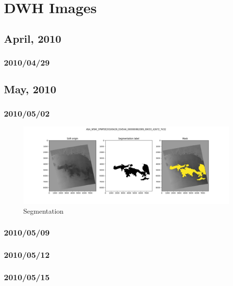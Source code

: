 \documentclass{article}
\begin{document}
\section{DWH Images}

\subsection{April, 2010}
\subsubsection{2010/04/29}

\subsection{May, 2010}
\subsubsection{2010/05/02}
\begin{figure}
  \begin{center}
    \includegraphics[scale=0.9]{figures/ASA_WSM_1PNPDE20100429_034544_000000862089_00033_42672_7432.png}
  \end{center}
  \caption{Segmentation}\label{fig:2010_05_02}
\end{figure}

\subsubsection{2010/05/09}

\subsubsection{2010/05/12}

\subsubsection{2010/05/15}
\end{document}
